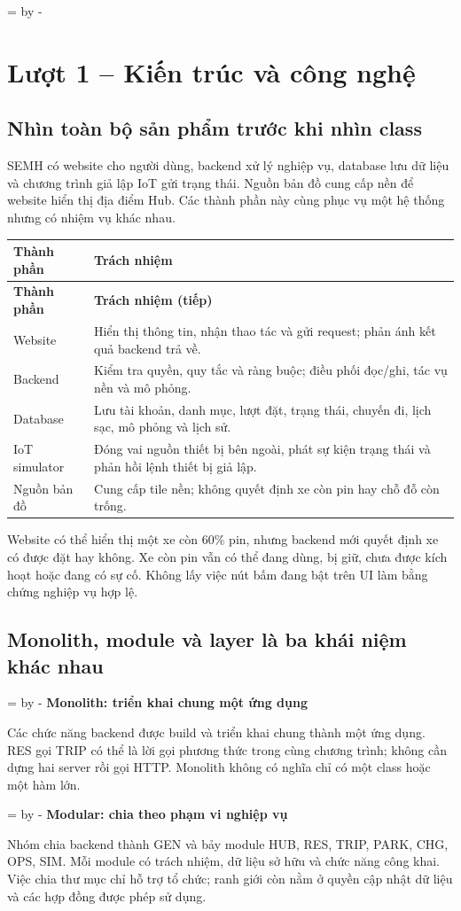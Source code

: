 \documentclass[12pt,a4paper]{article}
\newcommand{\Needspace}[1]{%
  \par\begingroup\dimen0=\pagegoal\advance\dimen0 by -\pagetotal
  \ifdim\dimen0<#1\relax\newpage\fi\endgroup}
\newcommand{\Lesson}[1]{\par\bigskip\Needspace{0.52\textheight}\section{#1}}
\newcommand{\Point}[1]{\par\medskip\Needspace{4\baselineskip}\noindent\textbf{#1}\par\nobreak\smallskip}
\newenvironment{PairTable}[2]{%
  \begin{longtable}{|L{39mm}|L{106mm}|}\hline
  \textbf{#1} & \textbf{#2}\\\hline\endfirsthead
  \hline\textbf{#1} & \textbf{#2 (tiếp)}\\\hline\endhead
}{\end{longtable}}
\begin{document}
\Lesson{Lượt 1 -- Kiến trúc và công nghệ}
\subsection{Nhìn toàn bộ sản phẩm trước khi nhìn class}
SEMH có website cho người dùng, backend xử lý nghiệp vụ, database lưu dữ liệu và chương trình giả lập IoT gửi trạng thái. Nguồn bản đồ cung cấp nền để website hiển thị địa điểm Hub. Các thành phần này cùng phục vụ một hệ thống nhưng có nhiệm vụ khác nhau.

\begin{PairTable}{Thành phần}{Trách nhiệm}
Website & Hiển thị thông tin, nhận thao tác và gửi request; phản ánh kết quả backend trả về.\\\hline
Backend & Kiểm tra quyền, quy tắc và ràng buộc; điều phối đọc/ghi, tác vụ nền và mô phỏng.\\\hline
Database & Lưu tài khoản, danh mục, lượt đặt, trạng thái, chuyến đi, lịch sạc, mô phỏng và lịch sử.\\\hline
IoT simulator & Đóng vai nguồn thiết bị bên ngoài, phát sự kiện trạng thái và phản hồi lệnh thiết bị giả lập.\\\hline
Nguồn bản đồ & Cung cấp tile nền; không quyết định xe còn pin hay chỗ đỗ còn trống.\\\hline
\end{PairTable}

Website có thể hiển thị một xe còn 60\% pin, nhưng backend mới quyết định xe có được đặt hay không. Xe còn pin vẫn có thể đang dùng, bị giữ, chưa được kích hoạt hoặc đang có sự cố. Không lấy việc nút bấm đang bật trên UI làm bằng chứng nghiệp vụ hợp lệ.

\subsection{Monolith, module và layer là ba khái niệm khác nhau}
\Point{Monolith: triển khai chung một ứng dụng}
Các chức năng backend được build và triển khai chung thành một ứng dụng. RES gọi TRIP có thể là lời gọi phương thức trong cùng chương trình; không cần dựng hai server rồi gọi HTTP. Monolith không có nghĩa chỉ có một class hoặc một hàm lớn.

\Point{Modular: chia theo phạm vi nghiệp vụ}
Nhóm chia backend thành GEN và bảy module HUB, RES, TRIP, PARK, CHG, OPS, SIM. Mỗi module có trách nhiệm, dữ liệu sở hữu và chức năng công khai. Việc chia thư mục chỉ hỗ trợ tổ chức; ranh giới còn nằm ở quyền cập nhật dữ liệu và các hợp đồng được phép sử dụng.
\end{document}
